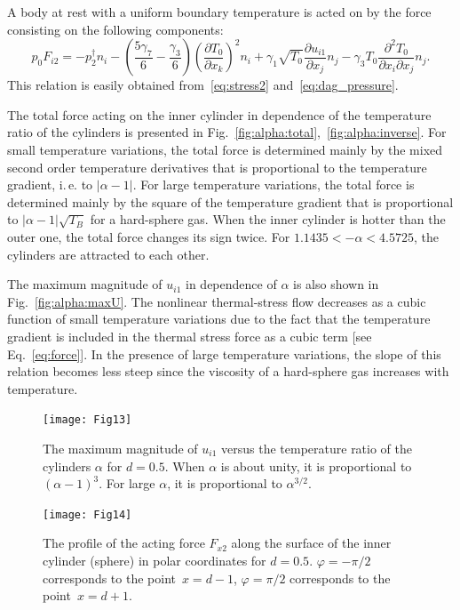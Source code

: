 \documentclass[smallextended, referee]{svjour3} %
\newcommand{\pder}[2][]{\frac{\partial#1}{\partial#2}}
\newcommand{\pderder}[3][]{\frac{\partial^2#1}{\partial#2\partial#3}}
\begin{document}
A body at rest with a uniform boundary temperature is acted on by the force consisting on
the following components:
\begin{equation}\label{eq:force:terms}
    p_0F_{i2} = - p_2^\dag n_i
                - \left(\frac{5\gamma_7}{6} - \frac{\gamma_3}{6}\right) \left(\pder[T_0]{x_k}\right)^2 n_i
                + \gamma_1\sqrt{T_0} \pder[u_{i1}]{x_j} n_j
                - \gamma_3 T_0 \pderder[T_0]{x_i}{x_j} n_j.
\end{equation}
This relation is easily obtained from~\eqref{eq:stress2} and~\eqref{eq:dag_pressure}.

The total force acting on the inner cylinder in dependence of the temperature ratio of the cylinders
is presented in Fig.~\ref{fig:alpha:total},~\ref{fig:alpha:inverse}.
For small temperature variations, the total force is determined mainly
by the mixed second order temperature derivatives
that is proportional to the temperature gradient, i.\,e. to \(|\alpha-1|\).
For large temperature variations, the total force is determined mainly
by the square of the temperature gradient that is proportional to \(|\alpha-1|\sqrt{T_B}\) for a hard-sphere gas.
When the inner cylinder is hotter than the outer one, the total force changes its sign twice.
For \(1.1435 < -\alpha < 4.5725\), the cylinders are attracted to each other.

The maximum magnitude of \(u_{i1}\) in dependence of \(\alpha\) is also shown in Fig.~\ref{fig:alpha:maxU}.
The nonlinear thermal-stress flow decreases as a cubic function of small temperature variations
due to the fact that the temperature gradient is included in the thermal stress force
as a cubic term [see Eq.~\eqref{eq:force}]. In the presence of large temperature variations,
the slope of this relation becomes less steep since the viscosity of a hard-sphere gas increases with temperature.

\begin{figure}[ht]
    \centering
    \begin{minipage}{.48\textwidth}
        \centering
        \texttt{[image: Fig13]}
        \caption{The maximum magnitude of \(u_{i1}\) versus
        	the temperature ratio of the cylinders \(\alpha\) for \(d=0.5\).
            	When \(\alpha\) is about unity, it is proportional to \((\alpha-1)^3\).
            	For large \(\alpha\), it is proportional to \(\alpha^{3/2}\).}
        \label{fig:alpha:maxU}
    \end{minipage}
    \quad
    \begin{minipage}{.48\textwidth}
        \centering
        \texttt{[image: Fig14]}
        \caption{The profile of the acting force \(F_{x2}\) along the surface of
        	the inner cylinder (sphere) in polar coordinates for \(d=0.5\).
        	\(\varphi = -\pi/2\) corresponds to the point~\(x=d-1\),
        	\(\varphi = \pi/2\) corresponds to the point~\(x=d+1\).}
        \label{fig:force:phi}
    \end{minipage}
\end{figure}
\end{document}
